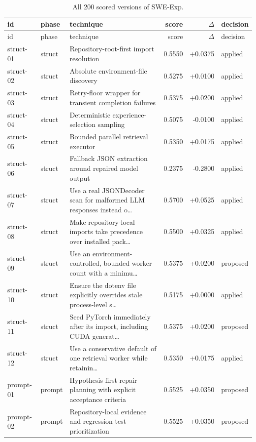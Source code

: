 \begin{center}\scriptsize\begin{longtable}{llp{5.2cm}rrl}
\caption{All 200 scored versions of SWE-Exp.}\\
\toprule id & phase & technique & score & $\Delta$ & decision \\ \midrule \endfirsthead
\toprule id & phase & technique & score & $\Delta$ & decision \\ \midrule \endhead
struct-01 & struct & Repository-root-first import resolution & 0.5550 & +0.0375 & applied \\
struct-02 & struct & Absolute environment-file discovery & 0.5275 & +0.0100 & applied \\
struct-03 & struct & Retry-floor wrapper for transient completion failures & 0.5375 & +0.0200 & applied \\
struct-04 & struct & Deterministic experience-selection sampling & 0.5075 & -0.0100 & applied \\
struct-05 & struct & Bounded parallel retrieval executor & 0.5350 & +0.0175 & applied \\
struct-06 & struct & Fallback JSON extraction around repaired model output & 0.2375 & -0.2800 & applied \\
struct-07 & struct & Use a real JSONDecoder scan for malformed LLM responses instead o\ldots{} & 0.5700 & +0.0525 & applied \\
struct-08 & struct & Make repository-local imports take precedence over installed pack\ldots{} & 0.5500 & +0.0325 & applied \\
struct-09 & struct & Use an environment-controlled, bounded worker count with a minimu\ldots{} & 0.5375 & +0.0200 & proposed \\
struct-10 & struct & Ensure the dotenv file explicitly overrides stale process-level s\ldots{} & 0.5175 & +0.0000 & applied \\
struct-11 & struct & Seed PyTorch immediately after its import, including CUDA generat\ldots{} & 0.5375 & +0.0200 & proposed \\
struct-12 & struct & Use a conservative default of one retrieval worker while retainin\ldots{} & 0.5350 & +0.0175 & applied \\
prompt-01 & prompt & Hypothesis-first repair planning with explicit acceptance criteria & 0.5525 & +0.0350 & proposed \\
prompt-02 & prompt & Repository-local evidence and regression-test prioritization & 0.5525 & +0.0350 & proposed \\

\end{longtable}
\end{center}

